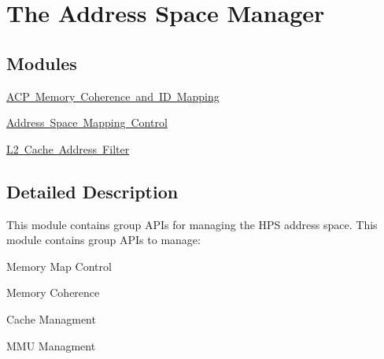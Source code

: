 \hypertarget{group__ADDR__SPACE__MGR}{}\section{The Address Space Manager}
\label{group__ADDR__SPACE__MGR}
\subsection*{Modules}
\begin{DoxyCompactItemize}
\item 
\mbox{\hyperlink{group__ADDR__SPACE__MGR__MEM__COHERENCE}{A\+C\+P Memory Coherence and I\+D Mapping}}
\item 
\mbox{\hyperlink{group__ADDR__SPACE__MGR__REMAP}{Address Space Mapping Control}}
\item 
\mbox{\hyperlink{group__L2__ADDR__FLTR}{L2 Cache Address Filter}}
\end{DoxyCompactItemize}


\subsection{Detailed Description}
This module contains group A\+P\+Is for managing the H\+PS address space. This module contains group A\+P\+Is to manage\+:
\begin{DoxyItemize}
\item Memory Map Control
\item Memory Coherence
\item Cache Managment
\item M\+MU Managment 
\end{DoxyItemize}